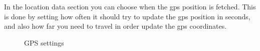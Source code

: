 \newpage
In the location data section you can choose when the gps position is fetched. This is done by setting how often it should try to update the gps position in seconds, and also how far you need to travel in order update the gps coordinates. 

\begin{figure}[h]
%
\caption{GPS settings}
\label{fig:OlimpicCircleTT1}
\end{figure}

